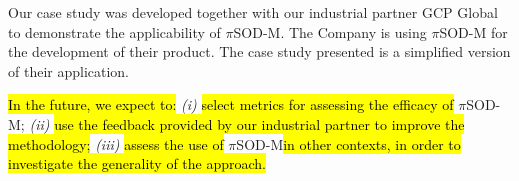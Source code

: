 \documentclass{singlecol-new}
\theoremstyle{TH}{
\newtheorem{lemma}{Lemma}
\newtheorem{theorem}[lemma]{Theorem}
\newtheorem{corrolary}[lemma]{Corrolary}
\newtheorem{conjecture}[lemma]{Conjecture}
\newtheorem{proposition}[lemma]{Proposition}
\newtheorem{claim}[lemma]{Claim}
\newtheorem{stheorem}[lemma]{Wrong Theorem}
\newtheorem{algorithm}{Algorithm}
}
\theoremstyle{THrm}{
\newtheorem{definition}{Definition}[section]
\newtheorem{question}{Question}[section]
\newtheorem{remark}{Remark}
\newtheorem{scheme}{Scheme}
}
\theoremstyle{THhit}{
\newtheorem{case}{Case}[section]
}
\theoremstyle{THhsl}{
\newtheorem{example}{Example}
}
\newcommand{\pisodm}[0]{$\pi$SOD-M\xspace}
\begin{document}
Our case study was developed together with our industrial partner GCP Global to demonstrate the applicability of \pisodm.
The Company is using \pisodm for the development of their product.
The case study presented is a simplified version of their application. 

\hl{In the future, we expect to:}
\textit{(i)} \hl{select metrics for assessing the efficacy of} \pisodm;
%
\textit{(ii)} \hl{use the feedback provided by our industrial partner to improve the methodology;}
%
\textit{(iii)} \hl{assess the use of} \pisodm \hl{in other contexts, in order to investigate the generality of the approach. }



\end{document}
